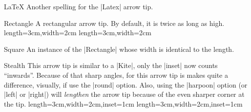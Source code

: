 \begin{arrowtipsimple}{LaTeX}
    Another spelling for the |Latex| arrow tip.
\end{arrowtipsimple}

\begin{arrowtip}{Rectangle}{
    A rectangular arrow tip. By default, it is twice as long as high.
}%
{length=3cm,width=2cm}%
{length=3cm,width=2cm}

    \begin{arrowexamples}
        \arrowexample[]
        \arrowexampledup[sep]
        \arrowexampledupdot[sep]
        \arrowexample[open]
        \arrowexample[length=4pt]
        \arrowexample[round]
        \arrowexample[slant=.3]
        \arrowexample[left]
        \arrowexample[right]
        \arrowexample[red]
    \end{arrowexamples}
\end{arrowtip}

\begin{arrowtipsimple}{Square}
    An instance of the |Rectangle| whose width is identical to the length.
    \begin{arrowexamples}
        \arrowexample[]
        \arrowexampledup[sep]
        \arrowexampledupdot[sep]
        \arrowexample[open]
        \arrowexample[length=4pt]
        \arrowexample[round]
        \arrowexample[slant=.3]
        \arrowexample[left]
        \arrowexample[right]
        \arrowexample[red]
    \end{arrowexamples}
\end{arrowtipsimple}

\begin{arrowtip}{Stealth}{
    This arrow tip is similar to a |Kite|, only the |inset| now counts
    ``inwards''. Because of that sharp angles, for this arrow tip is makes
    quite a difference, visually, if use the |round| option. Also, using the
    |harpoon| option (or |left| or |right|) will \emph{lengthen} the arrow tip
    because of the even sharper corner at the tip.
}%
{length=3cm,width=2cm,inset=1cm}%
{length=3cm,width=2cm,inset=1cm}

    \begin{arrowexamples}
        \arrowexample[]
        \arrowexampledup[sep]
        \arrowexampledupdot[sep]
        \arrowexample[open]
        \arrowexample[length=6pt,width=4pt]
        \arrowexample[length=6pt,width=4pt,inset=1.5pt]
        \arrowexample[round]
        \arrowexample[slant=.3]
        \arrowexample[left]
        \arrowexample[right]
        \arrowexample[red]
    \end{arrowexamples}
\end{arrowtip}

